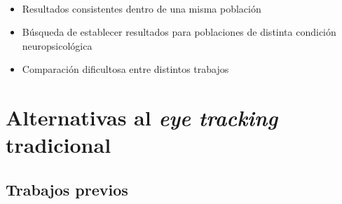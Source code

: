 \documentclass[aspectratio=169]{beamer}
\begin{document}
\begin{frame}{~}
    \begin{itemize}
    \item Resultados consistentes dentro de una misma población

    \item Búsqueda de establecer resultados para poblaciones de distinta condición neuropsicológica

    \item Comparación dificultosa entre distintos trabajos
    \end{itemize}

\end{frame}

\section{Alternativas al \textit{eye tracking} tradicional}

\subsection{Trabajos previos}
\end{document}
